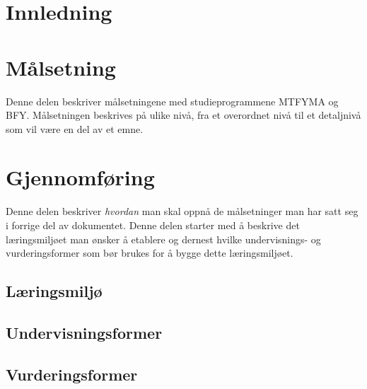 \documentclass[a4paper, oneside, 12pt]{memoir}
\begin{document}
\frontmatter
\tableofcontents
{}

\part{Innledning}

\mainmatter



\part{Målsetning}
\label{part:goals}

Denne delen beskriver målsetningene med studieprogrammene MTFYMA og BFY. Målsetningen beskrives på ulike nivå, fra et overordnet nivå til et detaljnivå som vil være en del av et emne.






%

%

%
%

\part{Gjennomføring}
\label{part:tla}

Denne delen beskriver \emph{hvordan} man skal oppnå de målsetninger man har satt seg i forrige del av dokumentet. Denne delen starter med å beskrive det læringsmiljøet man ønsker å etablere og dernest hvilke undervisnings- og vurderingsformer som bør brukes for å bygge dette læringsmiljøet.

	\chapter{Læringsmiljø}
	
	\chapter{Undervisningsformer}
	
	\chapter{Vurderingsformer}
\end{document}
